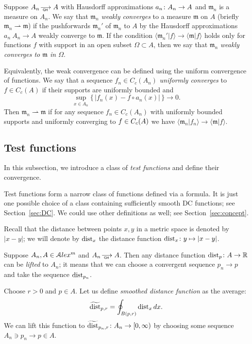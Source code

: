 Suppose $A_n\GHto A$ with Hausdorff approximations $a_n\:A_n\zz\to A$ and
$\mathfrak m_n$ is a measure on $A_n$.
We say that $\mathfrak m_n$ \emph{weakly converges} to a measure $\mathfrak m$ on $A$ (briefly $\mathfrak m_n\rightharpoonup \mathfrak m$) if the pushforwards $\mathfrak m_n'$ of $\mathfrak m_n$ to $A$  by the Hausdorff approximations $a_n\:A_n\to A$ weakly converge to 
$\mathfrak m$.
If the condition $\langle \mathfrak m_n'|f\rangle \to \langle \mathfrak m|f\rangle $ holds only for functions $f$ with support in an open subset $\Omega\subset A$, then we say that $\mathfrak m_n$ \emph{weakly converges to $\mathfrak m$ in $\Omega$}.

Equivalently, the weak convergence can be defined using the uniform convergence of functions.
We say that  a sequence $f_n\in C_c(A_n)$
\emph{uniformly converges} to $f\in C_c(A)$
if their supports are uniformly bounded and
\[\sup_{x\in A_n}\{\,|f_n(x)-f\circ a_n(x)|\,\}\to 0.\]
Then  $\mathfrak m_n\rightharpoonup \mathfrak m$
if for any sequence $f_n\in C_c(A_n)$
with uniformly bounded supports and
uniformly converging to $f\zz\in C_c(A)$
we have $\langle \mathfrak m_n|f_n\rangle \to \langle \mathfrak m|f\rangle $.

\subsection{Test functions}\label{sec:test-functions}

In this subsection, we introduce a class of \emph{test functions} and define their convergence.

Test functions form a narrow class of functions defined via a formula.
It is just one possible choice of a class containing sufficiently smooth DC functions; see Section~\ref{sec:DC}.
We could use other definitions as well; see Section~\ref{sec:concept}.

Recall that the distance between points $x,y$ in a metric space is denoted by $|x-y|$;
we will denote by $\operatorname{\rm dist}_x$ the distance function $\operatorname{\rm dist}_x\colon y\mapsto |x-y|$.

{\sloppy 

Suppose $A_n, A\in \mathcal{A}lex^m$ and  $A_n\GHto A$.
Then any distance function $\dist_p\:A\zz\to\RR$ can be \emph{lifted} to $A_n$;
it means that we can choose a convergent sequence $p_n\to p$ and take the
sequence $\operatorname{\rm dist}_{p_n}$.

}

Choose $r>0$ and $p\in A$.
Let us define \emph{smoothed distance function} as the average:
$$\widetilde{\operatorname{\rm dist}}_{p,r} =\oint_{B(p,r)} \operatorname{\rm dist}_{x}dx.$$ 
We can lift this function to
$\widetilde{\operatorname{\rm dist}}_{p_n,r}\colon A_n\to [0,\infty)$
by choosing some  sequence $A_n\ni p_n\to p\in A$.

